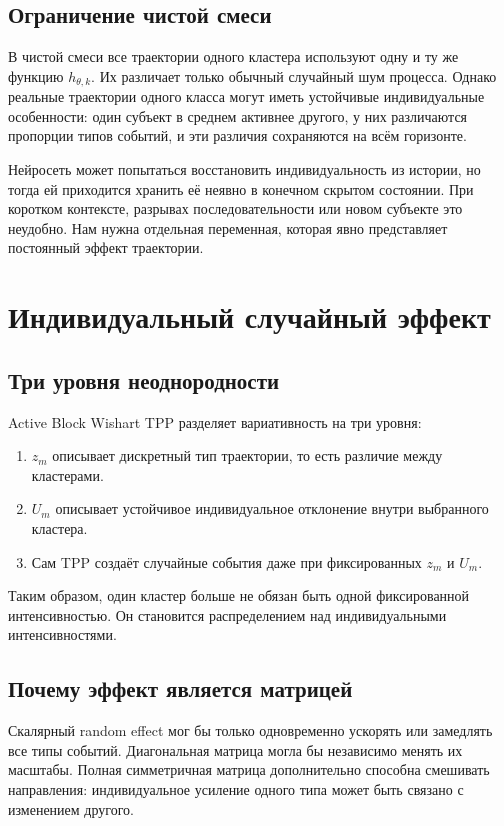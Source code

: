 \documentclass[12pt,a4paper]{article}
\begin{document}
\subsection{Ограничение чистой смеси}

В чистой смеси все траектории одного кластера используют одну и ту же функцию \(h_{\theta,k}\). Их различает только обычный случайный шум процесса. Однако реальные траектории одного класса могут иметь устойчивые индивидуальные особенности: один субъект в среднем активнее другого, у них различаются пропорции типов событий, и эти различия сохраняются на всём горизонте.

Нейросеть может попытаться восстановить индивидуальность из истории, но тогда ей приходится хранить её неявно в конечном скрытом состоянии. При коротком контексте, разрывах последовательности или новом субъекте это неудобно. Нам нужна отдельная переменная, которая явно представляет постоянный эффект траектории.

\section{Индивидуальный случайный эффект}

\subsection{Три уровня неоднородности}

Active Block Wishart TPP разделяет вариативность на три уровня:
\begin{enumerate}
\item \(z_m\) описывает дискретный тип траектории, то есть различие между кластерами.
\item \(U_m\) описывает устойчивое индивидуальное отклонение внутри выбранного кластера.
\item Сам TPP создаёт случайные события даже при фиксированных \(z_m\) и \(U_m\).
\end{enumerate}

Таким образом, один кластер больше не обязан быть одной фиксированной интенсивностью. Он становится распределением над индивидуальными интенсивностями.

\subsection{Почему эффект является матрицей}

Скалярный random effect мог бы только одновременно ускорять или замедлять все типы событий. Диагональная матрица могла бы независимо менять их масштабы. Полная симметричная матрица дополнительно способна смешивать направления: индивидуальное усиление одного типа может быть связано с изменением другого.
\end{document}
